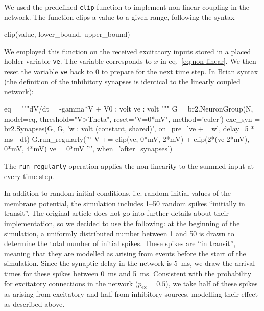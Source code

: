 \documentclass[10pt,a4paper,onecolumn]{article}
\begin{document}
We used the predefined \verb|clip| function to implement non-linear coupling in the network. The function clips a value to a given range, following the syntax
\begin{code}
clip(value, lower_bound, upper_bound)
\end{code}

We employed this function on the received excitatory inputs stored in a placed holder variable \verb|ve|. The variable corresponds to $x$ in eq.~\ref{eq:non-linear}. We then reset the variable \verb|ve| back to 0 to prepare for the next time step. In Brian syntax (the definition of the inhibitory synapses is identical to the linearly coupled network):


\begin{code}
eq = """dV/dt = -gamma*V + V0 : volt
        ve : volt
     """
G = br2.NeuronGroup(N, model=eq, threshold="V>Theta",
                    reset="V=0*mV", method='euler')
exc_syn = br2.Synapses(G, G, 'w : volt (constant, shared)',
                       on_pre='ve += w', delay=5 * ms - dt)
G.run_regularly('''
                V += clip(ve, 0*mV, 2*mV) + clip(2*(ve-2*mV), 0*mV, 4*mV)
                ve = 0*mV
                ''', when='after_synapses')
\end{code}

The \verb|run_regularly| operation applies the non-linearity to the summed input at every time step.

In addition to random initial conditions, i.e. random initial values of the membrane potential, the simulation includes 1--50 random spikes ``initially in transit''. The original article does not go into further details about their implementation, so we decided to use the following: at the beginning of the simulation, a uniformly distributed number between 1 and 50 is drawn to determine the total number of initial spikes. These spikes are ``in transit'', meaning that they are modelled as arising from events before the start of the simulation. Since the synaptic delay in the network is \SI{5}{\milli\second}, we draw the arrival times for these spikes between \SI{0}{\milli\second} and \SI{5}{\milli\second}. Consistent with the probability for excitatory connections in the network ($p_\text{ex}=0.5$), we take half of these spikes as arising from excitatory and half from inhibitory sources, modelling their effect as described above.
\end{document}
